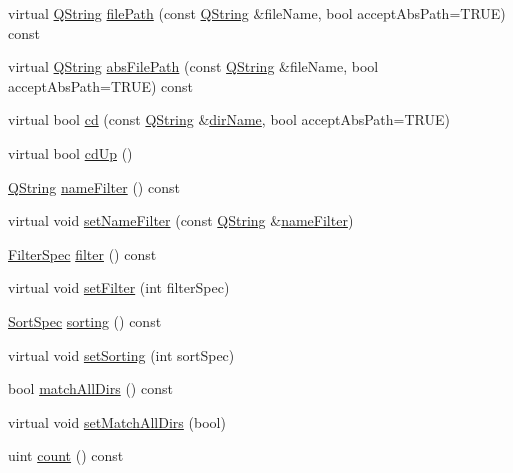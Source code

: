 \begin{DoxyCompactItemize}
\item 
virtual \mbox{\hyperlink{class_q_string}{Q\+String}} \mbox{\hyperlink{class_q_dir_a5210a2a0b20d77d2d9ab29e7631310e6}{file\+Path}} (const \mbox{\hyperlink{class_q_string}{Q\+String}} \&file\+Name, bool accept\+Abs\+Path=T\+R\+UE) const
\item 
virtual \mbox{\hyperlink{class_q_string}{Q\+String}} \mbox{\hyperlink{class_q_dir_aca84b0a728bc2b88c3ab55cbed6e18c4}{abs\+File\+Path}} (const \mbox{\hyperlink{class_q_string}{Q\+String}} \&file\+Name, bool accept\+Abs\+Path=T\+R\+UE) const
\item 
virtual bool \mbox{\hyperlink{class_q_dir_a5a58d7a5387627fa479f2ac376895e6a}{cd}} (const \mbox{\hyperlink{class_q_string}{Q\+String}} \&\mbox{\hyperlink{class_q_dir_a2c904d64a7194a57ee583d111cbbdeff}{dir\+Name}}, bool accept\+Abs\+Path=T\+R\+UE)
\item 
virtual bool \mbox{\hyperlink{class_q_dir_a22a212babdfa332de6ee9d07f96dc2ba}{cd\+Up}} ()
\item 
\mbox{\hyperlink{class_q_string}{Q\+String}} \mbox{\hyperlink{class_q_dir_a6d71d046861c1728359a6119a1250a74}{name\+Filter}} () const
\item 
virtual void \mbox{\hyperlink{class_q_dir_a26b95e183a9ba9410219a3ce4d8c3416}{set\+Name\+Filter}} (const \mbox{\hyperlink{class_q_string}{Q\+String}} \&\mbox{\hyperlink{class_q_dir_a6d71d046861c1728359a6119a1250a74}{name\+Filter}})
\item 
\mbox{\hyperlink{class_q_dir_a8b8c5b4f0028081f094c85129b8cc8b1}{Filter\+Spec}} \mbox{\hyperlink{class_q_dir_a55b8ed62e97891ffc50d0c4a2b8fe31d}{filter}} () const
\item 
virtual void \mbox{\hyperlink{class_q_dir_a68d9e723870b5f8226353dc6047a35ee}{set\+Filter}} (int filter\+Spec)
\item 
\mbox{\hyperlink{class_q_dir_a428a858abe9593efc498b6641b41994c}{Sort\+Spec}} \mbox{\hyperlink{class_q_dir_a389b638c7f9f89b84795ae76ad365360}{sorting}} () const
\item 
virtual void \mbox{\hyperlink{class_q_dir_a65280d204cd65975953e3eb2a63da778}{set\+Sorting}} (int sort\+Spec)
\item 
bool \mbox{\hyperlink{class_q_dir_a54bd9584a7c74412da7945ef57d895e0}{match\+All\+Dirs}} () const
\item 
virtual void \mbox{\hyperlink{class_q_dir_aec96bf79103196eefd2a38ff74aeadd0}{set\+Match\+All\+Dirs}} (bool)
\item 
uint \mbox{\hyperlink{class_q_dir_a66e09c7fe6ec493febc170bdafbe71ab}{count}} () const

\end{DoxyCompactItemize}
